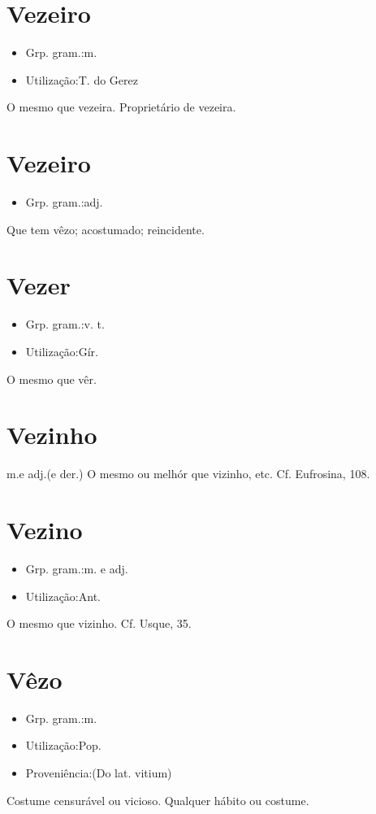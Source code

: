 \documentclass{article}
\begin{document}
\section{Vezeiro}
\begin{itemize}
\item {Grp. gram.:m.}
\end{itemize}
\begin{itemize}
\item {Utilização:T. do Gerez}
\end{itemize}
O mesmo que \textunderscore vezeira\textunderscore .
Proprietário de vezeira.
\section{Vezeiro}
\begin{itemize}
\item {Grp. gram.:adj.}
\end{itemize}
Que tem vêzo; acostumado; reincidente.
\section{Vezer}
\begin{itemize}
\item {Grp. gram.:v. t.}
\end{itemize}
\begin{itemize}
\item {Utilização:Gír.}
\end{itemize}
O mesmo que \textunderscore vêr\textunderscore .
\section{Vezinho}
\textunderscore m.\textunderscore  e \textunderscore adj.\textunderscore  (e der.)
O mesmo ou melhór que \textunderscore vizinho\textunderscore , etc. Cf. \textunderscore Eufrosina\textunderscore , 108.
\section{Vezino}
\begin{itemize}
\item {Grp. gram.:m.  e  adj.}
\end{itemize}
\begin{itemize}
\item {Utilização:Ant.}
\end{itemize}
O mesmo que \textunderscore vizinho\textunderscore . Cf. Usque, 35.
\section{Vêzo}
\begin{itemize}
\item {Grp. gram.:m.}
\end{itemize}
\begin{itemize}
\item {Utilização:Pop.}
\end{itemize}
\begin{itemize}
\item {Proveniência:(Do lat. \textunderscore vitium\textunderscore )}
\end{itemize}
Costume censurável ou vicioso.
Qualquer hábito ou costume.
\end{document}
